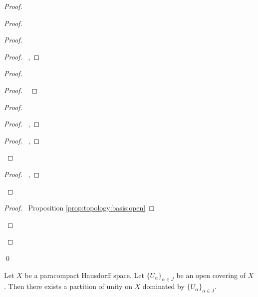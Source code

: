 \begin{proof}
\begin{proof}
\begin{proof}
    \begin{proof}
      \pf\ , 
    \end{proof}
    \begin{proof}
      \begin{proof}
        \pf\ 
      \end{proof}
      \begin{proof}
        \begin{proof}
          \pf\ , 
        \end{proof}
        \qedstep
        \begin{proof}
          \pf\ , 
        \end{proof}
      \end{proof}
      \begin{proof}
        \pf\ , 
      \end{proof}
    \end{proof}
    \qedstep
    \begin{proof}
      \pf\ Proposition \ref{prop:topology:basis:open}
    \end{proof}
  \end{proof}
\end{proof}
\qed
\end{proof}

\begin{thm}[AC]
\label{thm:metric:paracompact_Hausdorff:partition_of_unity}
  Let $X$ be a paracompact Hausdorff space. Let $\{ U_\alpha \}_{\alpha \in J}$ be an open covering of $X$. Then there exists a partition of unity on $X$ dominated by $\{ U_\alpha \}_{\alpha \in J}$.
\end{thm}

